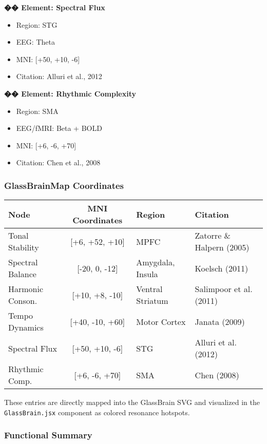 \documentclass[10pt]{article}
\begin{document}
\textbf{�� Element: Spectral Flux}

\begin{itemize}
    \item Region: STG
    \item EEG: Theta
    \item MNI: [+50, +10, -6]
    \item Citation: Alluri et al., 2012
\end{itemize}

\textbf{�� Element: Rhythmic Complexity}

\begin{itemize}
    \item Region: SMA
    \item EEG/fMRI: Beta + BOLD
    \item MNI: [+6, -6, +70]
    \item Citation: Chen et al., 2008
\end{itemize}

\subsubsection*{GlassBrainMap Coordinates}

\begin{center}
\begin{tabular}{|l|c|l|l|}
\hline
\textbf{Node} & \textbf{MNI Coordinates} & \textbf{Region} & \textbf{Citation} \\
\hline
Tonal Stability & [+6, +52, +10] & MPFC & Zatorre \& Halpern (2005) \\
Spectral Balance & [-20, 0, -12] & Amygdala, Insula & Koelsch (2011) \\
Harmonic Conson. & [+10, +8, -10] & Ventral Striatum & Salimpoor et al. (2011) \\
Tempo Dynamics & [+40, -10, +60] & Motor Cortex & Janata (2009) \\
Spectral Flux & [+50, +10, -6] & STG & Alluri et al. (2012) \\
Rhythmic Comp. & [+6, -6, +70] & SMA & Chen (2008) \\
\hline
\end{tabular}
\end{center}

These entries are directly mapped into the GlassBrain SVG and visualized in the \texttt{GlassBrain.jsx} component as colored resonance hotspots.

\subsubsection*{Functional Summary}
\end{document}

